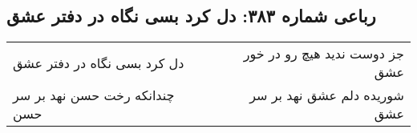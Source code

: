 \begin{center}
\section*{رباعی شماره ۳۸۳: دل کرد بسی نگاه در دفتر عشق}
\label{sec:sh383}
\begin{longtable}{l p{0.5cm} r}
دل کرد بسی نگاه در دفتر عشق
&&
جز دوست ندید هیچ رو در خور عشق
\\
چندانکه رخت حسن نهد بر سر حسن
&&
شوریده دلم عشق نهد بر سر عشق
\\
\end{longtable}
\end{center}
